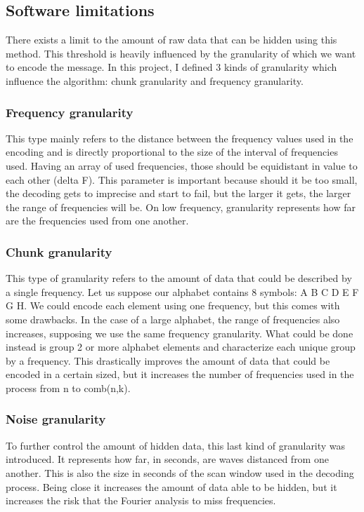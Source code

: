 \documentclass[12pt]{report}
\begin{document}
\subsection{Software limitations}

There exists a limit to the amount of raw data that can be hidden using this method. This threshold is heavily influenced by the granularity of which we want to encode the message. In this project, I defined 3 kinds of granularity which influence the algorithm: chunk granularity and frequency granularity.

\subsubsection{Frequency granularity}
This type mainly refers to the distance between the frequency values used in the encoding and is directly proportional to the size of the interval of frequencies used. Having an array of used frequencies, those should be equidistant in value to each other (delta F). This parameter is important because should it be too small, the decoding gets to imprecise and start to fail, but the larger it gets, the larger the range of frequencies will be. On low frequency, granularity represents how far are the frequencies used from one another.

\subsubsection{Chunk granularity}
This type of granularity refers to the amount of data that could be described by a single frequency. Let us suppose our alphabet contains 8 symbols: A B C D E F G H. We could encode each element using one frequency, but this comes with some drawbacks. In the case of a large alphabet, the range of frequencies also increases, supposing we use the same frequency granularity. What could be done instead is group 2 or more alphabet elements and characterize each unique group by a frequency. This drastically improves the amount of data that could be encoded in a certain sized, but it increases the number of frequencies used in the process from n to comb(n,k).

\subsubsection{Noise granularity}
To further control the amount of hidden data, this last kind of granularity was introduced. It represents how far, in seconds, are waves distanced from one another. This is also the size in seconds of the scan window used in the decoding process. Being close it increases the amount of data able to be hidden, but it increases the risk that the Fourier analysis to miss frequencies.
\end{document}
